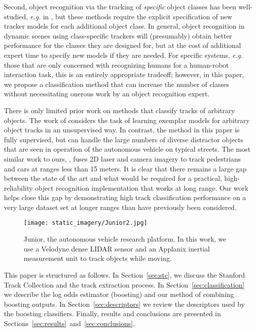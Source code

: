 \documentclass[letterpaper, 10 pt, conference]{ieeeconf}  %
\begin{document}
Second, object recognition via the tracking of \textit{specific} object classes has been well-studied, \textit{e.g.} in \cite{Andriluka2008, Petrovskaya2009, Wu2007, Schulz2003, Schulz2006}, but these methods require the explicit specification of new tracker models for each additional object class.  In general, object recognition in dynamic scenes using class-specific trackers will (presumably) obtain better performance for the classes they are designed for, but at the cost of additional expert time to specify new models if they are needed.  For specific systems, \textit{e.g.} those that are only concerned with recognizing humans for a human-robot interaction task, this is an entirely appropriate tradeoff; however, in this paper, we propose a classification method that can increase the number of classes without necessitating onerous work by an object recognition expert.

There is only limited prior work on methods that classify tracks of arbitrary objects.  The work of \cite{Luber2008} considers the task of learning exemplar models for arbitrary object tracks in an unsupervised way.  In contrast, the method in this paper is fully supervised, but can handle the large numbers of diverse distractor objects that are seen in operation of the autonomous vehicle on typical streets.  The most similar work to ours, \cite{Spinello2010}, fuses 2D laser and camera imagery to track pedestrians and cars at ranges less than 15 meters.  It is clear that there remains a large gap between the state of the art and what would be required for a practical, high-reliability object recognition implementation that works at long range.  Our work helps close this gap by demonstrating high track classification performance on a very large dataset set at longer ranges than have previously been considered.


\begin{figure}
  \centering
  \texttt{[image: static\_imagery/Junior2.jpg]}
  \caption{Junior, the autonomous vehicle research platform.  In this work, we use a Velodyne dense LIDAR sensor and an Applanix inertial measurement unit to track objects while moving.}
  \label{fig:junior}
\end{figure}

This paper is structured as follows.  In Section~\ref{sec:stc}, we discuss the Stanford Track Collection and the track extraction process.  In Section~\ref{sec:classification} we describe the log odds estimator (boosting) and our method of combining boosting outputs.  In Section~\ref{sec:descriptors} we review the descriptors used by the boosting classifiers.  Finally, results and conclusions are presented in Sections~\ref{sec:results}~and~\ref{sec:conclusions}.
\end{document}
